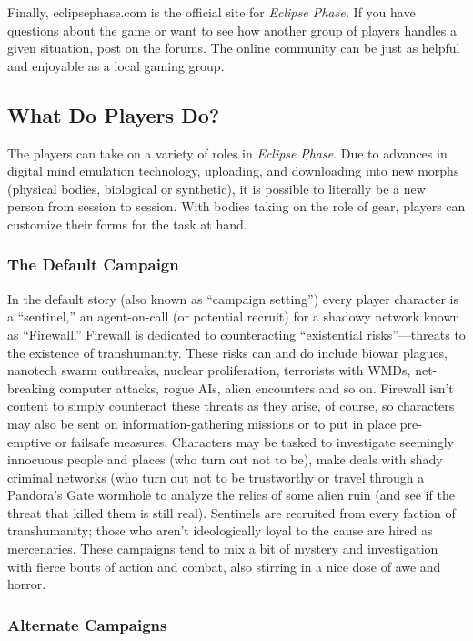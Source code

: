 Finally, eclipsephase.com is the official site for 
\textit{Eclipse Phase.} If you have questions about the 
game or want to see how another group of players 
handles a given situation, post on the forums. The 
online community can be just as helpful and enjoyable
as a local gaming group.

\subsection{What Do Players Do?}

The players can take on a variety of roles in \textit{Eclipse }
\textit{Phase}. Due to advances in digital mind emulation 
technology, uploading, and downloading into new 
morphs (physical bodies, biological or synthetic), it is 
possible to literally be a new person from session to 
session. With bodies taking on the role of gear, players 
can customize their forms for the task at hand.

\subsubsection{The Default Campaign}

In the default story (also known as ``campaign setting'')
every player character is a ``sentinel,'' an
agent-on-call (or potential recruit) for a shadowy 
network known as ``Firewall.'' Firewall is dedicated 
to counteracting ``existential risks''—threats to the 
existence of transhumanity. These risks can and do 
include biowar plagues, nanotech swarm outbreaks, 
nuclear proliferation, terrorists with WMDs, net-breaking
computer attacks, rogue AIs, alien encounters
and so on. Firewall isn't content to simply
counteract these threats as they arise, of course, 
so characters may also be sent on information-gathering
missions or to put in place pre-emptive
or failsafe measures. Characters may be tasked to 
investigate seemingly innocuous people and places 
(who turn out not to be), make deals with shady 
criminal networks (who turn out not to be trustworthy
or travel through a Pandora's Gate wormhole
to analyze the relics of some alien ruin (and see if 
the threat that killed them is still real). Sentinels 
are recruited from every faction of transhumanity; 
those who aren't ideologically loyal to the cause are 
hired as mercenaries. These campaigns tend to mix 
a bit of mystery and investigation with fierce bouts 
of action and combat, also stirring in a nice dose of 
awe and horror.

\subsubsection{Alternate Campaigns}

